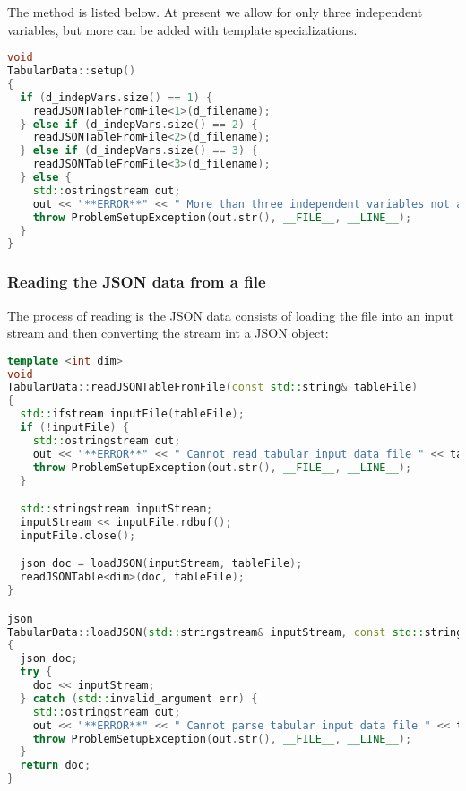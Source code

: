 The  method is listed below.  At present we allow for only three
independent variables, but more can be added with template specializations.
\begin{lstlisting}[language=Cpp]
void
TabularData::setup()
{
  if (d_indepVars.size() == 1) {
    readJSONTableFromFile<1>(d_filename);
  } else if (d_indepVars.size() == 2) {
    readJSONTableFromFile<2>(d_filename);
  } else if (d_indepVars.size() == 3) {
    readJSONTableFromFile<3>(d_filename);
  } else {
    std::ostringstream out;
    out << "**ERROR**" << " More than three independent variables not allowed in " << d_filename;
    throw ProblemSetupException(out.str(), __FILE__, __LINE__);
  }
}
\end{lstlisting}

\subsubsection{Reading the JSON data from a file}
The process of reading is the JSON data consists of loading the file into an 
input stream and then converting the stream int a JSON object:
\begin{lstlisting}[language=Cpp]
template <int dim>
void
TabularData::readJSONTableFromFile(const std::string& tableFile)
{
  std::ifstream inputFile(tableFile);
  if (!inputFile) {
    std::ostringstream out;
    out << "**ERROR**" << " Cannot read tabular input data file " << tableFile;
    throw ProblemSetupException(out.str(), __FILE__, __LINE__);
  }

  std::stringstream inputStream;
  inputStream << inputFile.rdbuf();
  inputFile.close();

  json doc = loadJSON(inputStream, tableFile);
  readJSONTable<dim>(doc, tableFile);
}

json
TabularData::loadJSON(std::stringstream& inputStream, const std::string& tableFile)
{
  json doc;
  try {
    doc << inputStream;
  } catch (std::invalid_argument err) {
    std::ostringstream out;
    out << "**ERROR**" << " Cannot parse tabular input data file " << tableFile << "\n" << " Please check that the file is valid JSON using a linter";
    throw ProblemSetupException(out.str(), __FILE__, __LINE__);
  }
  return doc;
}
\end{lstlisting}


